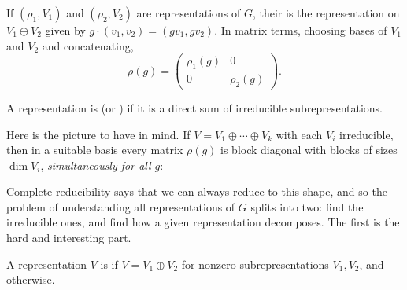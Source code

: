 \begin{definition}
	If $(\rho_1, V_1)$ and $(\rho_2, V_2)$ are representations of $G$, their  is the representation on $V_1 \oplus V_2$ given by $g \cdot (v_1, v_2) = (g v_1, g v_2)$. In matrix terms, choosing bases of $V_1$ and $V_2$ and concatenating,
	$$\rho(g) = \begin{pmatrix} \rho_1(g) & 0 \\ 0 & \rho_2(g)\end{pmatrix}.$$
\end{definition}

\begin{definition}
	A representation is  (or ) if it is a direct sum of irreducible subrepresentations.
\end{definition}

Here is the picture to have in mind. If $V = V_1 \oplus \cdots \oplus V_k$ with each $V_i$ irreducible, then in a suitable basis every matrix $\rho(g)$ is block diagonal with blocks of sizes $\dim V_i$, \emph{simultaneously for all $g$}:

\begin{center}
\end{center}
\vspace{0.4em}

Complete reducibility says that we can always reduce to this shape, and so the problem of understanding all representations of $G$ splits into two: find the irreducible ones, and find how a given representation decomposes. The first is the hard and interesting part.

\begin{definition}[Decomposable]
	A representation $V$ is  if $V = V_1 \oplus V_2$ for nonzero subrepresentations $V_1, V_2$, and  otherwise.
\end{definition}

